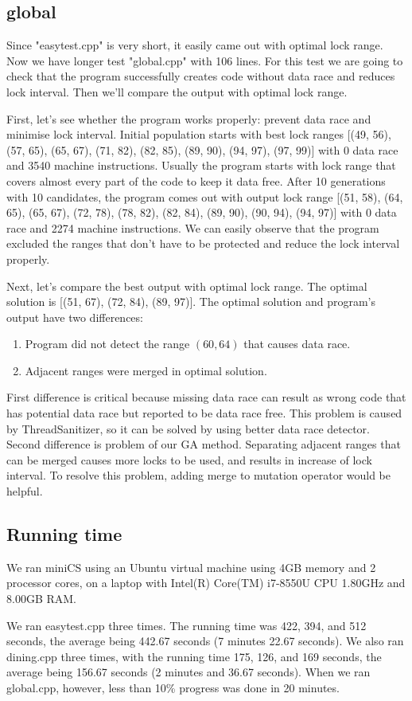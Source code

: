 \subsection{global}
Since "easytest.cpp" is very short, it easily came out with optimal lock range. Now we have longer test "global.cpp" with 106 lines. For this test we are going to check that the program successfully creates code without data race and reduces lock interval. Then we'll compare the output with optimal lock range.

First, let's see whether the program works properly: prevent data race and minimise lock interval. Initial population starts with best lock ranges [(49, 56), (57, 65), (65, 67), (71, 82), (82, 85), (89, 90), (94, 97), (97, 99)] with 0 data race and 3540 machine instructions. Usually the program starts with lock range that covers almost every part of the code to keep it data free. After 10 generations with 10 candidates, the program comes out with output lock range [(51, 58), (64, 65), (65, 67), (72, 78), (78, 82), (82, 84), (89, 90), (90, 94), (94, 97)] with 0 data race and 2274 machine instructions. We can easily observe that the program excluded the ranges that don't have to be protected and reduce the lock interval properly. 

Next, let's compare the best output with optimal lock range. The optimal solution is [(51, 67), (72, 84), (89, 97)]. The optimal solution and program's output have two differences:

\begin{enumerate}
    \item Program did not detect the range $(60, 64)$ that causes data race.
    \item Adjacent ranges were merged in optimal solution.
\end{enumerate}

First difference is critical because missing data race can result as wrong code that has potential data race but reported to be data race free. This problem is caused by ThreadSanitizer, so it can be solved by using better data race detector. Second difference is problem of our GA method. Separating adjacent ranges that can be merged causes more locks to be used, and results in increase of lock interval. To resolve this problem, adding merge to mutation operator would be helpful.

\subsection{Running time}

We ran miniCS using an Ubuntu virtual machine using 4GB memory and 2 processor cores, on a laptop with Intel(R) Core(TM) i7-8550U CPU 1.80GHz and 8.00GB RAM.

We ran easytest.cpp three times. The running time was 422, 394, and 512 seconds, the average being 442.67 seconds (7 minutes 22.67 seconds). We also ran dining.cpp three times, with the running time 175, 126, and 169 seconds, the average being 156.67 seconds (2 minutes and 36.67 seconds). When we ran global.cpp, however, less than 10\% progress was done in 20 minutes.
